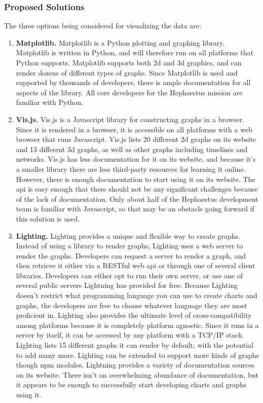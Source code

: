 \documentclass[letterpaper,10pt]{article}
\begin{document}
\subsubsection{Proposed Solutions}
The three options being considered for visualizing the data are:
\begin{enumerate}
\item{
\textbf{Matplotlib.}
Matplotlib is a Python plotting and graphing library.
Matplotlib is written in Python, and will therefore run on all platforms that Python supports.
Matplotlib supports both 2d and 3d graphics, and can render dozens of different
types of graphs.
Since Matplotlib is used and supported by thousands of developers, there is ample
documentation for all aspects of the library.
All core developers for the Hephaestus mission are familiar with Python.
}

\item{
\textbf{Vis.js.}
Vis.js is a Javascript library for constructing graphs in a browser.
Since it is rendered in a browser, it is accessible on all platforms with a web browser
that runs Javascript.
Vis.js lists 20 different 2d graphs on its website and 13 different 3d graphs, as well
as other graphs including timelines and networks. 
Vis.js has less documentation for it on its website, and because it's a smaller library
there are less third-party resources for learning it online.
However, there is enough documentation to start using it on its website.
The \gls{api} is easy enough that there should not be any significant challenges
because of the lack of documentation.
Only about half of the Hephaestus development team is familiar with Javascript,
so that may be an obstacle going forward if this solution is used.
}

\item{
\textbf{Lighting.}
Lighting provides a unique and flexible way to create graphs.
Instead of using a library to render graphs, Lighting uses a web server to
render the graphs.
Developers can request a server to render a graph, and then retrieve it either via
a RESTful web \gls{api} or through one of several client libraries.
Developers can either opt to run their own server, or use one of several public
servers Lightning has provided for free.
Because Lighting doesn't restrict what programming language you can use to
create charts and graphs, the developers are free to choose whatever language
they are most proficient in.
Lighting also provides the ultimate level of cross-compatibility among platforms
because it is completely platform agnostic.
Since it runs in a server by itself, it can be accessed by any platform with a TCP/IP stack.
Lighting lists 15 different graphs it can render by default; with the potential to add
many more.
Lighting can be extended to support more kinds of graphs though \gls{npm} modules.
Lightning provides a variety of documentation sources on its website.
There isn't an overwhelming abundance of documentation, but it appears to be
enough to successfully start developing charts and graphs using it.
}
\end{enumerate}
\end{document}
